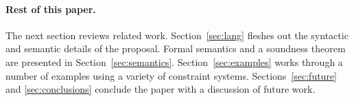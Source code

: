 \paragraph{Rest of this paper.}

The next section reviews related work.
Section~\ref{sec:lang} fleshes out the syntactic and semantic details of the
proposal.
Formal semantics
and a soundness theorem
are presented in Section~\ref{sec:semantics}.
Section~\ref{sec:examples} works through a number of
examples using a variety of constraint systems.
Sections~\ref{sec:future}
and \ref{sec:conclusions} conclude the paper with a discussion of
future work.

